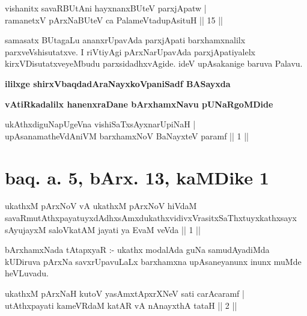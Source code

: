 
\begin{shl}
vishanitx savaRBUtAni hayxnanxBUteV parxjApatw  | \\
ramanetxV pArxNaBUteV ca PalameVtadupAsituH \hfill ||  15 || 
\end{shl}

\begin{artha}
samasatx BUtagaLu ananxrUpavAda parxjApati barxhamxnalilx parxveVshisutatxve. I riVtiyAgi pArxNarUpavAda parxjApatiyalelx kirxVDisutatxveyeMbudu parxsidadhxvAgide. ideV upAsakanige baruva Palavu.
\end{artha}

\begin{center}
{\bf ililxge shirxVbaqdadAraNayxkoVpaniSadf BASayxda}
\smallskip

{\bf vAtiRkadalilx hanenxraDane bArxhamxNavu pUNaRgoMDide}
\end{center}

\begin{shl}
ukAthxdiguNapUgeVna vishiSaTxsAyxnarUpiNaH  | \\
upAsanamatheVdAniVM barxhamxNoV BaNayxteV paramf \hfill ||  1 || 
\end{shl}

\section*{baq. a. 5, bArx. 13, kaMDike 1}

\begin{shl}
ukathxM pArxNoV vA ukathxM pArxNoV hiVdaM savaRmutAthxpayatuyxdAdhxsAmxdukathxvidivxVrasitxSaThxtuyxkathxsayx sAyujayxM saloVkatAM jayati ya EvaM veVda || 1 ||
\end{shl}

\begin{artha}
bArxhamxNada tAtapxyaR :- ukathx modalAda guNa samudAyadiMda kUDiruva pArxNa savxrUpavuLaLx barxhamxna upAsaneyanunx inunx muMde heVLuvadu.
\end{artha}


\begin{shl}
\footnotemark[1]{}ukathxM pArxNaH kutoV yasAmxtApxrXNeV sati carAcaramf | \\
\footnotemark[2]{}utAthxpayati kameVRdaM katAR vA nAnayxthA tataH \hfill ||  2 || 
\end{shl}

